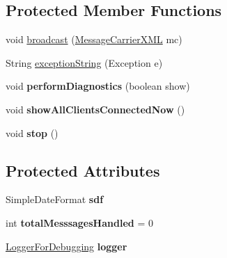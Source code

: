 \subsection*{Protected Member Functions}
\begin{DoxyCompactItemize}
\item 
void \hyperlink{classgov_1_1fnal_1_1ppd_1_1dd_1_1chat_1_1MessagingServer_ad4cb5effceeb2b11031e3cf2ec0e5939}{broadcast} (\hyperlink{classgov_1_1fnal_1_1ppd_1_1dd_1_1xml_1_1MessageCarrierXML}{Message\-Carrier\-X\-M\-L} mc)
\item 
String \hyperlink{classgov_1_1fnal_1_1ppd_1_1dd_1_1chat_1_1MessagingServer_afe655a915ee116333ee6f1c8331b7929}{exception\-String} (Exception e)
\item 
\hypertarget{classgov_1_1fnal_1_1ppd_1_1dd_1_1chat_1_1MessagingServer_af24f72f6ce9d270c33afb4032d9c968b}{void {\bfseries perform\-Diagnostics} (boolean show)}\label{classgov_1_1fnal_1_1ppd_1_1dd_1_1chat_1_1MessagingServer_af24f72f6ce9d270c33afb4032d9c968b}

\item 
\hypertarget{classgov_1_1fnal_1_1ppd_1_1dd_1_1chat_1_1MessagingServer_a90da887bb782b08af3fb1dbce8c3e502}{void {\bfseries show\-All\-Clients\-Connected\-Now} ()}\label{classgov_1_1fnal_1_1ppd_1_1dd_1_1chat_1_1MessagingServer_a90da887bb782b08af3fb1dbce8c3e502}

\item 
\hypertarget{classgov_1_1fnal_1_1ppd_1_1dd_1_1chat_1_1MessagingServer_a2ab9736895b528ec810dd27eb5761295}{void {\bfseries stop} ()}\label{classgov_1_1fnal_1_1ppd_1_1dd_1_1chat_1_1MessagingServer_a2ab9736895b528ec810dd27eb5761295}

\end{DoxyCompactItemize}
\subsection*{Protected Attributes}
\begin{DoxyCompactItemize}
\item 
\hypertarget{classgov_1_1fnal_1_1ppd_1_1dd_1_1chat_1_1MessagingServer_ac727c375b30722fb0d0a88f27eb97954}{Simple\-Date\-Format {\bfseries sdf}}\label{classgov_1_1fnal_1_1ppd_1_1dd_1_1chat_1_1MessagingServer_ac727c375b30722fb0d0a88f27eb97954}

\item 
\hypertarget{classgov_1_1fnal_1_1ppd_1_1dd_1_1chat_1_1MessagingServer_a6847562b2441991b550f7b3cb7fe8f2d}{int {\bfseries total\-Messsages\-Handled} = 0}\label{classgov_1_1fnal_1_1ppd_1_1dd_1_1chat_1_1MessagingServer_a6847562b2441991b550f7b3cb7fe8f2d}

\item 
\hypertarget{classgov_1_1fnal_1_1ppd_1_1dd_1_1chat_1_1MessagingServer_acc91232824dd5e89347e0d8ac29abae8}{\hyperlink{classgov_1_1fnal_1_1ppd_1_1dd_1_1chat_1_1LoggerForDebugging}{Logger\-For\-Debugging} {\bfseries logger}}\label{classgov_1_1fnal_1_1ppd_1_1dd_1_1chat_1_1MessagingServer_acc91232824dd5e89347e0d8ac29abae8}

\end{DoxyCompactItemize}


